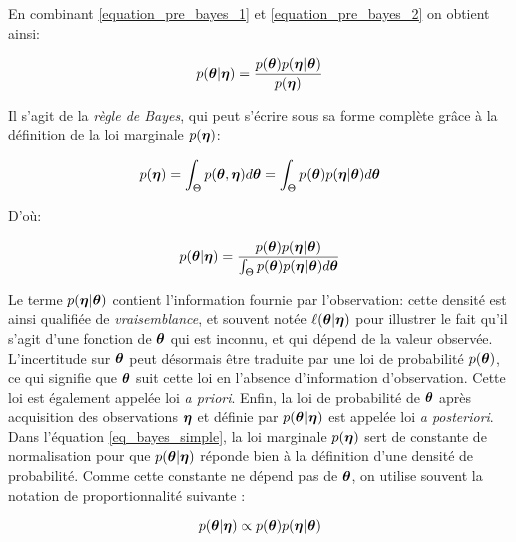 	En combinant \eqref{equation_pre_bayes_1} et \eqref{equation_pre_bayes_2} on obtient ainsi:
	
	\begin{equation}
		p({\bm{\theta}} | {\bm{\eta}}) = \dfrac{p({\bm{\theta}})p({\bm{\eta}} | {\bm{\theta}})}{p({\bm{\eta}})}
		\label{eq_bayes_simple}
	\end{equation}
	
	Il s'agit de la \textit{règle de Bayes}, qui peut s'écrire sous sa forme complète grâce à la définition de la loi marginale $p({\bm{\eta}})$:
	
	\begin{equation}
		p({\bm{\eta}}) = \int_{\Theta} p({\bm{\theta}},{\bm{\eta}})d{\bm{\theta}} = \int_{\Theta} p({\bm{\theta}})p({\bm{\eta}}|{\bm{\theta}})d{\bm{\theta}}
		\label{eq_definition_marginale_d}
	\end{equation}
	
	D'où:

	\begin{equation}
	p({\bm{\theta}} | {\bm{\eta}}) = \dfrac{p({\bm{\theta}})p({\bm{\eta}} | {\bm{\theta}})}{ \int_{\Theta} p({\bm{\theta}})p({\bm{\eta}}|{\bm{\theta}})d{\bm{\theta}}}
	\label{eq_bayes_simple}
	\end{equation}
	
	Le terme $p({\bm{\eta}}|{\bm{\theta}})$ contient l'information fournie par l'observation: cette densité est ainsi qualifiée de \textit{vraisemblance}, et souvent notée $\ell({\bm{\theta}} |{\bm{\eta}})$ pour illustrer le fait qu'il s'agit d'une fonction de ${\bm{\theta}}$ qui est inconnu, et qui dépend de la valeur observée. 
	L'incertitude sur ${\bm{\theta}}$ peut désormais être traduite par une loi de probabilité $p({\bm{\theta}})$, ce qui signifie que ${\bm{\theta}}$ suit cette loi en l'absence d'information d'observation. Cette loi est également appelée loi  \textit{a priori}. 
	Enfin, la loi de probabilité de ${\bm{\theta}}$ après acquisition des observations ${\bm{\eta}}$ et définie par  	$p({\bm{\theta}} | {\bm{\eta}})$ est appelée loi \textit{a posteriori}.\\
	
	Dans l'équation \eqref{eq_bayes_simple}, la loi marginale $p({\bm{\eta}})$ sert de constante de normalisation pour que $p({\bm{\theta}} | {\bm{\eta}})$ réponde bien à la définition d'une densité de probabilité. Comme cette constante ne dépend pas de ${\bm{\theta}}$, on utilise souvent la notation de proportionnalité suivante : 
	
	\begin{equation}
	p({\bm{\theta}} | {\bm{\eta}}) \propto p({\bm{\theta}})p({\bm{\eta}} | {\bm{\theta}})
	\label{eq_bayes_proportionnalite}
	\end{equation}
	
